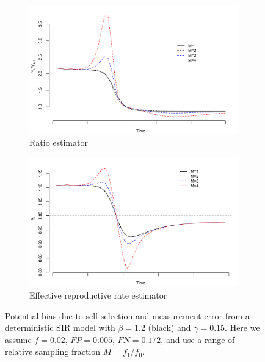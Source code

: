\documentclass[12pt]{article}
\begin{document}
\begin{figure}[!th]
\centering
\begin{subfigure}{.5\textwidth}
  \centering
  \includegraphics[width=.9\linewidth]{../methods/figs/sir_ratio.png}
  \caption{Ratio estimator}
  \label{fig:ratio-bias}
\end{subfigure}%
\begin{subfigure}{.5\textwidth}
  \centering
  \includegraphics[width=.9\linewidth]{../methods/figs/sir_rt.png}
  \caption{Effective reproductive rate estimator}
  \label{fig:r0-bias}
\end{subfigure}
\caption{Potential bias due to self-selection and measurement error from a deterministic SIR model with $\beta = 1.2$ (black) and $\gamma = 0.15$.  Here we assume $f = 0.02$, $FP = 0.005$, $FN = 0.172$, and use a range of relative sampling fraction $M = f_1/f_0$.}
\label{fig:rates}
\end{figure}
\end{document}
